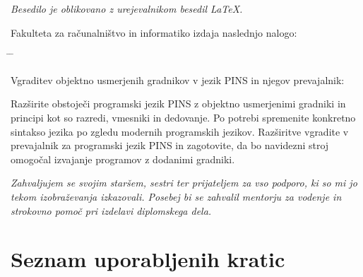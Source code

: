 \documentclass[a4paper, 12p]{book}
\newcommand{\clearemptydoublepage}{\newpage{\pagestyle{empty}\cleardoublepage}}
\begin{document}
\begin{center}
\mbox{}\vfill
\emph{Besedilo je oblikovano z urejevalnikom besedil \LaTeX.}
\end{center}
\clearemptydoublepage

\thispagestyle{empty}
\vspace*{4cm}

\noindent
Fakulteta za računalništvo in informatiko izdaja naslednjo nalogo:
\medskip
\begin{tabbing}
\hspace{32mm}\= \hspace{6cm} \= \kill


Vgraditev objektno usmerjenih gradnikov v jezik PINS in njegov prevajalnik:
\end{tabbing}
Razširite obstoječi programski jezik PINS z objektno usmerjenimi gradniki in principi kot so razredi, vmesniki in dedovanje. Po potrebi spremenite konkretno sintakso jezika po zgledu modernih programskih jezikov. Razširitve vgradite v prevajalnik za programski jezik PINS in zagotovite, da bo navidezni stroj omogočal izvajanje programov z dodanimi gradniki.
\vspace{15mm}






\vspace{2cm}

\clearemptydoublepage

\thispagestyle{empty}\mbox{}\vfill\null\it%
\noindent
Zahvaljujem se svojim staršem, sestri ter prijateljem za vso podporo, ki so mi jo tekom izobraževanja izkazovali. Posebej bi se zahvalil mentorju za vodenje in strokovno pomoč pri izdelavi diplomskega dela.
\rm\normalfont

\clearemptydoublepage

\pagestyle{empty}
\def\thepage{}%
\tableofcontents{}


\clearemptydoublepage


\chapter*{Seznam uporabljenih kratic}  %
\end{document}
